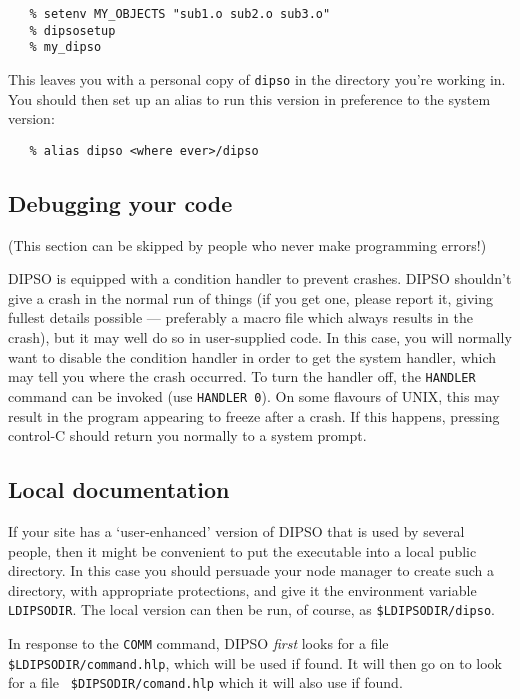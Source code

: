\documentclass[twoside,11pt]{article}
\newcommand{\htmlref}[2]{#1}
\renewcommand{\_}{\texttt{\symbol{95}}}
\begin{document}
\begin{verbatim}
   % setenv MY_OBJECTS "sub1.o sub2.o sub3.o"
   % dipsosetup
   % my_dipso
\end{verbatim}

This leaves you with a personal copy of {\tt{dipso}}  in the directory you're
working in. You should then set up an alias to run this version in preference
to the system version:

\begin{verbatim}
   % alias dipso <where ever>/dipso
\end{verbatim}

\subsection {Debugging your code}

(This section can be skipped by people who never make programming
errors!)

DIPSO is equipped with a condition handler to prevent crashes. DIPSO
shouldn't give a crash in the normal run of things (if you get one,
please report it, giving fullest details possible --- preferably a macro
file which always results in the crash), but it may well do so in
user-supplied code. In this case, you will normally want to disable the
condition handler in order to get the system handler, which may tell you
where the crash occurred. To turn the handler off, the \htmlref{{\tt{HANDLER}}}{COM:HANDLER} 
command can be invoked (use {\tt{HANDLER}  0}). On some flavours of UNIX,
this may result in the program appearing to freeze after a crash. If this
happens, pressing control-C should return you normally to a system
prompt.

\subsection {\label{SEC:LOC}Local documentation}

If your site has a `user-enhanced' version of DIPSO that is used by
several people, then it might be convenient to put the executable into a
local public directory. In this case you should persuade your node
manager to create such a directory, with appropriate protections, and
give it the environment variable {\tt{LDIPSODIR}}.  The local version can
then be run, of course, as {\tt{\$LDIPSODIR/dipso}}. 

In response to the \htmlref{{\tt{COMM}}}{COM:COMMANDS}  command, DIPSO {\em
first} looks for a file {\tt{\$LDIPSO\-DIR/command\-.hlp}},  which will be
used if found. It will then go on to look for a file {\tt
\$DIPSODIR/comand\-.hlp} which it will also use if found.
\end{document}

